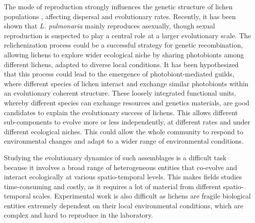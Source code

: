 \documentclass[fleqn,10pt]{wlscirep}
\begin{document}
The mode of reproduction strongly influences the genetic structure of lichen populations \cite{dal2012vertical,dal2011phylogeny}, affecting dispersal and evolutionary rates. 
Recently, it has been shown that {\em L. pulmonaria} mainly reproduces asexually\cite{dal2012vertical}, though sexual reproduction is suspected to play a central role at a larger evolutionary scale. The relichenization process could be a successful strategy for genetic recombination, allowing lichens to  explore wider ecological niche by sharing photobionts among different lichens, adapted to diverse local conditions. It has been hypothesized that this process could lead to the emergence of photobiont-mediated guilds, where different species of lichen interact and exchange similar photobionts within an evolutionary coherent structure\cite{rikkinen2003ecological}. These loosely integrated functional units, whereby different species can exchange resources and genetics materials, are good candidates to explain the evolutionary success of lichens. This allows different sub-components to evolve more or less independently, at different rates and under different ecological niches. This could allow the whole community to respond to environmental changes and adapt to a wider range of environmental conditions.

Studying the evolutionary dynamics of such assemblages is a difficult task because it involves a broad range of heterogeneous entities that co-evolve and interact ecologically at various spatio-temporal levels. This makes fields studies time-consuming and costly, as it requires
a lot of material from different spatio-temporal scales. Experimental work is also difficult as lichens are fragile biological entities extremely dependent on their local environmental conditions, which are complex and hard to reproduce in the laboratory\cite{nash1996lichen}.    

%
\end{document}

